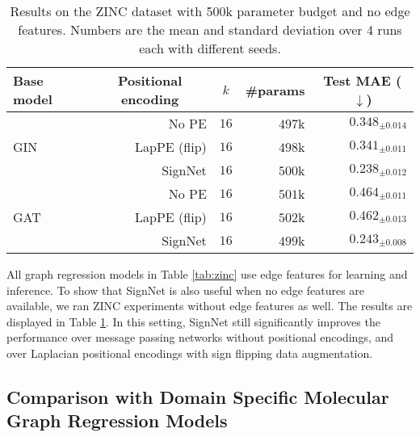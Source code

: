 \documentclass{article} \usepackage{iclr2023_conference,times}
\begin{document}
\begin{table}[ht]
    {\small
    \centering
    \caption{Results on the ZINC dataset with 500k parameter budget and no edge features. Numbers are the mean and standard deviation over 4 runs each with different seeds.}
    \label{tab:zinc_no_edge}
    \begin{center}
    \begin{tabular}{lrrrr}
        \toprule
        Base model
        & \multicolumn{1}{c}{Positional encoding} & \multicolumn{1}{c}{$k$} &  \multicolumn{1}{c}{\#params} & 
        \multicolumn{1}{c}{Test MAE ($\downarrow$)} \\
        \midrule
        \multirow{3}{*}{GIN} & No PE & $16$ & $497$k & $0.348_{\pm 0.014}$ \\
         & LapPE (flip) & $16$ & $498$k & $0.341_{\pm 0.011}$ \\
         & SignNet & $16$ & $500$k & $\mathbf{0.238_{\pm 0.012}}$ \\
        \midrule
        \multirow{3}{*}{GAT} & No PE &  $16$ & $501$k & $0.464_{\pm 0.011}$ \\
         & LapPE (flip) &$16$ & $502$k & $0.462_{\pm 0.013}$ \\
         & SignNet &  $16$ & $499$k & $\mathbf{0.243_{\pm 0.008}}$ \\
        \bottomrule
    \end{tabular}
    \end{center}
}
\end{table}


All graph regression models in Table \ref{tab:zinc} use edge features for learning and inference. To show that SignNet is also useful when no edge features are available, we ran ZINC experiments without edge features as well. The results are displayed in Table \ref{tab:zinc_no_edge}. In this setting, SignNet still significantly improves the performance over message passing networks without positional encodings, and over Laplacian positional encodings with sign flipping data augmentation.

\subsection{Comparison with Domain Specific Molecular Graph Regression Models}
\end{document}
